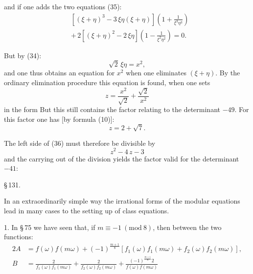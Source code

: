 and if one adds the two equations (35):
\[
\begin{aligned}
&[(\xi+\eta)^3-3\,\xi\eta(\xi+\eta)]\left(1+\frac{1}{\xi^3\eta^3}\right)\\
&+\,2[(\xi+\eta)^2-2\,\xi\eta]\left(1-\frac{1}{\xi^2\eta^2}\right)=0.
\end{aligned}
\]

But by (34):
\[
\sqrt2\,\xi\eta=x^2,
\]
and one thus obtains an equation for $x^2$ when one eliminates $(\xi+\eta)$. By the ordinary elimination procedure this equation is found, when one sets
\[
z=\frac{x^2}{\sqrt2}+\frac{\sqrt2}{x^2}
\]
in the form
But this still contains the factor relating to the determinant $-49$. For this factor one has [by formula (10)]:
\[
z=2+\sqrt7.
\]

The left side of (36) must therefore be divisible by
\[
z^2-4\,z-3
\]
and the carrying out of the division yields the factor valid for the determinant $-41$:

\begin{center}
\S\,131. 
\end{center}

In an extraordinarily simple way the irrational forms of the modular equations lead in many cases to the setting up of class equations.

1. In \S\,75 we have seen that, if $m\equiv -1\ (\mathrm{mod}\ 8)$, then between the two functions:
\[
\begin{aligned}
2A&=f(\omega)f(m\omega)+(-1)^{\frac{m+1}{8}}[f_1(\omega)f_1(m\omega)+f_2(\omega)f_2(m\omega)],\\
B&=\frac{2}{f_1(\omega)f_1(m\omega)}+\frac{2}{f_2(\omega)f_2(m\omega)}+\frac{(-1)^{\frac{m+1}{8}}2}{f(\omega)f(m\omega)}
\end{aligned}
\]
